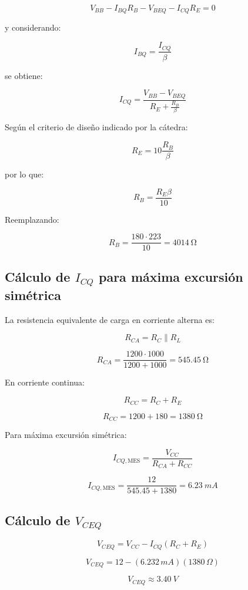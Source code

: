 \documentclass[a4paper,12pt]{article}
\begin{document}
\[
V_{BB}-I_{BQ}R_B-V_{BEQ}-I_{CQ}R_E=0
\]

y considerando:

\[
I_{BQ}=\frac{I_{CQ}}{\beta}
\]

se obtiene:

\[
I_{CQ}
=
\frac{V_{BB}-V_{BEQ}}
{R_E+\frac{R_B}{\beta}}
\]

Según el criterio de diseño indicado por la cátedra:

\[
R_E=10\frac{R_B}{\beta}
\]

por lo que:

\[
R_B=\frac{R_E\beta}{10}
\]

Reemplazando:

\[
R_B
=
\frac{180\cdot223}{10}
=
\boxed{\SI{4014}{\ohm}}
\]

\subsection{Cálculo de $I_{CQ}$ para máxima excursión simétrica}

La resistencia equivalente de carga en corriente alterna es:

\[
R_{CA}=R_C\parallel R_L
\]

\[
R_{CA}
=
\frac{1200\cdot1000}{1200+1000}
=
\boxed{\SI{545.45}{\ohm}}
\]

En corriente continua:

\[
R_{CC}=R_C+R_E
\]

\[
R_{CC}=1200+180
=
\boxed{\SI{1380}{\ohm}}
\]

Para máxima excursión simétrica:

\[
I_{CQ,\mathrm{MES}}
=
\frac{V_{CC}}
{R_{CA}+R_{CC}}
\]

\[
I_{CQ,\mathrm{MES}}
=
\frac{12}
{545.45+1380}
=
\boxed{\SI{6.23}{mA}}
\]

\subsection{Cálculo de $V_{CEQ}$}

\[
V_{CEQ}
=
V_{CC}
-
I_{CQ}(R_C+R_E)
\]

\[
V_{CEQ}
=
12
-
(6.232\,mA)(1380\,\Omega)
\]

\[
\boxed{V_{CEQ}\approx\SI{3.40}{V}}
\]

\end{document}

